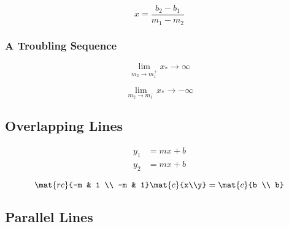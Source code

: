   \begin{equation*}   %
    x = \frac{b_{2} - b_{1}} {m_{1} - m_{2}}
  \end{equation*}

\subsubsection{A Troubling Sequence}  %

  \begin{equation*}   %
    \lim_{m_{2}\to m_{1}^{+}} x_{*} \to \infty
  \end{equation*}

  \begin{equation*}   %
    \lim_{m_{2}\to m_{1}^{-}} x_{*} \to -\infty
  \end{equation*}

\subsection{Overlapping Lines}  %

  \begin{equation*}   %
    \begin{split}
      y_{1} &= mx + b \\
      y_{2} &= mx + b
    \end{split}
  \end{equation*}

  \begin{equation*}   %
    \mat{rc}{-m & 1 \\ -m & 1} \mat{c}{x\\y} = \mat{c}{b \\ b}
  \end{equation*}

\subsection{Parallel Lines}  %

